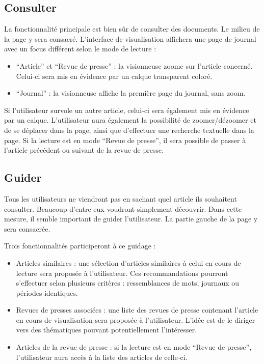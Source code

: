 \subsection{Consulter}
\label{sec:consultation_consulter}
La fonctionnalité principale est bien sûr de consulter des documents. Le milieu de la page y sera consacré.
L’interface de visualisation affichera une page de journal avec un focus différent selon le mode de lecture :
\begin{itemize}
\item “Article” et “Revue de presse” : la visionneuse zoome sur l’article concerné. Celui-ci sera mis en évidence par un calque transparent coloré.
\item “Journal” : la visionneuse affiche la première page du journal, sans zoom.
\end{itemize}
Si l’utilisateur survole un autre article, celui-ci sera également mis en évidence par un calque.
	L’utilisateur aura également la possibilité de zoomer/dézoomer et de se déplacer dans la page, ainsi que d’effectuer une recherche textuelle dans la page. Si la lecture est en mode “Revue de presse”, il sera possible de passer à l’article précédent ou suivant de la revue de presse.

\subsection{Guider}
\label{sec:consultation_guider}

	Tous les utilisateurs ne viendront pas en sachant quel article ils souhaitent consulter. Beaucoup d’entre eux voudront simplement découvrir. Dans cette mesure, il semble important de guider l’utilisateur. La partie gauche de la page y sera consacrée.

	Trois fonctionnalités participeront à ce guidage :
\begin{itemize}
\item Articles similaires : une sélection d’articles similaires à celui en cours de lecture sera proposée à l’utilisateur. Ces recommandations pourront s’effectuer selon plusieurs critères : ressemblances de mots, journaux ou périodes identiques.
\item Revues de presses associées : une liste des revues de presse contenant l’article en cours de visualisation sera proposée à l’utilisateur. L’idée est de le diriger vers des thématiques pouvant potentiellement l’intéresser.
\item Articles de la revue de presse : si la lecture est en mode “Revue de presse”, l’utilisateur aura accès à la liste des articles de celle-ci.
\end{itemize}